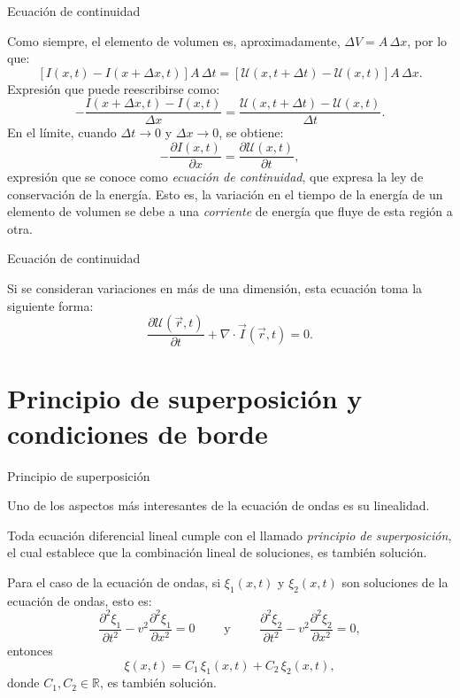 \documentclass[11pt,handout,aspectratio=1610]{beamer}
\newcommand{\pdiff}[2]{\frac{\partial #1}{\partial #2}}
\newcommand{\pddiff}[2]{\frac{\partial^2 #1}{\partial #2^2}}
\newcommand{\rr}{\mathbb{R}}
\newcommand{\vs}{\vspace{11pt}}
\begin{document}
\begin{frame}{Ecuación de continuidad}

    Como siempre, el elemento de volumen es, aproximadamente, $\Delta V = A \, \Delta x$, por lo que: $$ \left[I\left(x,t\right) - I \left(x + \Delta x, t\right)\right] A \, \Delta t = \left[\mathcal{U} \left(x,t + \Delta t\right) - \mathcal{U} \left(x,t\right)\right] A \, \Delta x. $$ Expresión que puede reescribirse como: $$ - \frac{I\left(x + \Delta x,t\right) - I \left(x, t\right)}{\Delta x} = \frac{\mathcal{U} \left(x,t + \Delta t\right) - \mathcal{U} \left(x,t\right)}{\Delta t}. $$ En el límite, cuando $\Delta t \to 0 $ y $\Delta x \to 0$, se obtiene: $$ - \pdiff{I\left(x,t\right)}{x} = \pdiff{\mathcal{U} \left(x,t\right)}{t}, $$ expresión que se conoce como \emph{ecuación de continuidad}, que expresa la ley de conservación de la energía. Esto es, la variación en el tiempo de la energía de un elemento de volumen se debe a una \emph{corriente} de energía que fluye de esta región a otra.

\end{frame}

\begin{frame}{Ecuación de continuidad}
    
    Si se consideran variaciones en más de una dimensión, esta ecuación toma la siguiente forma: $$ \pdiff{\mathcal{U} \left(\vec{r},t\right)}{t} + \nabla \cdot \vec{I} \left(\vec{r},t\right) = 0.$$

\end{frame}

\section{Principio de superposición y condiciones de borde}

\begin{frame}{Principio de superposición}

    Uno de los aspectos más interesantes de la ecuación de ondas es su linealidad. 
    
    \vs

    Toda ecuación diferencial lineal cumple con el llamado \emph{principio de superposición}, el cual establece que la combinación lineal de soluciones, es también solución. 
    
    \vs 
    
    Para el caso de la ecuación de ondas, si $\xi_1 \left(x,t\right)$ y $\xi_2 \left(x,t\right)$ son soluciones de la ecuación de ondas, esto es: $$ \pddiff{\xi_1}{t} - v^2 \pddiff{\xi_1}{x} = 0 \qquad \text{ y } \qquad \pddiff{\xi_2}{t} - v^2 \pddiff{\xi_2}{x} = 0, $$ entonces $$\xi \left(x,t\right) = C_1 \, \xi_1 \left(x,t\right) + C_2 \, \xi_2 \left(x,t\right), $$ donde $C_1, C_2 \in \rr $, es también solución.

\end{frame}
\end{document}
